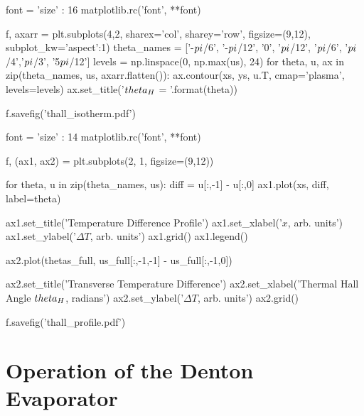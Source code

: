 \documentclass{thesis-umich}
\begin{document}
\begin{singlespace}
\begin{code}
font = {'size'   : 16}
matplotlib.rc('font', **font)

f, axarr = plt.subplots(4,2, sharex='col', 
                             sharey='row',
                             figsize=(9,12),
                             subplot_kw={'aspect':1})
theta_names = ['-$\\pi$/6', '-$\\pi$/12', '0', '$\\pi$/12',
               '$\\pi$/6', '$\\pi$/4','$\\pi$/3', '5$\\pi$/12']
levels = np.linspace(0, np.max(us), 24)
for theta, u, ax in zip(theta_names, us, axarr.flatten()):
    ax.contour(xs, ys, u.T, cmap='plasma', levels=levels)
    ax.set_title('$\\theta_H$ = {}'.format(theta))
    
f.savefig('thall_isotherm.pdf')

font = {'size'   : 14}
matplotlib.rc('font', **font)

f, (ax1, ax2) = plt.subplots(2, 1, figsize=(9,12))

for theta, u in zip(theta_names, us):
    diff = u[:,-1] - u[:,0]
    ax1.plot(xs, diff, label=theta)

ax1.set_title('Temperature Difference Profile')
ax1.set_xlabel('$x$, arb. units')
ax1.set_ylabel('$\Delta T$, arb. units')
ax1.grid()
ax1.legend()

ax2.plot(thetas_full, us_full[:,-1,-1] - us_full[:,-1,0])

ax2.set_title('Transverse Temperature Difference')
ax2.set_xlabel('Thermal Hall Angle $\\theta_H$, radians')
ax2.set_ylabel('$\Delta T$, arb. units')
ax2.grid()

f.savefig('thall_profile.pdf')

\end{code}
\end{singlespace}

\chapter{Operation of the Denton Evaporator}



\end{document}
